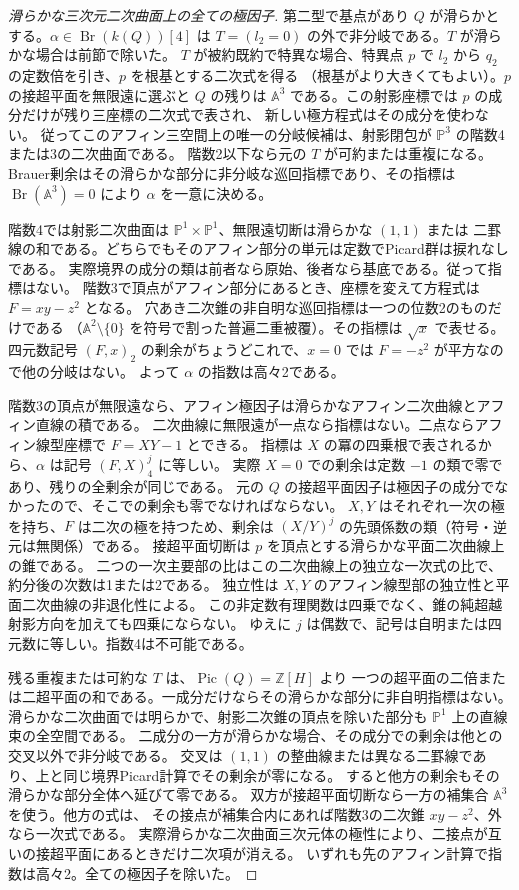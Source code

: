 \begin{proof}[滑らかな三次元二次曲面上の全ての極因子]
第二型で基点があり $Q$ が滑らかとする。$\alpha\in\operatorname{Br}(k(Q))[4]$ は
$T=(l_2=0)$ の外で非分岐である。$T$ が滑らかな場合は前節で除いた。
$T$ が被約既約で特異な場合、特異点 $p$ で $l_2$ から $q_2$ の定数倍を引き、$p$ を根基とする二次式を得る
（根基がより大きくてもよい）。$p$ の接超平面を無限遠に選ぶと
$Q$ の残りは $\mathbb A^3$ である。この射影座標では $p$ の成分だけが残り三座標の二次式で表され、
新しい極方程式はその成分を使わない。
従ってこのアフィン三空間上の唯一の分岐候補は、射影閉包が $\mathbb P^3$ の階数4または3の二次曲面である。
階数2以下なら元の $T$ が可約または重複になる。
Brauer剰余はその滑らかな部分に非分岐な巡回指標であり、その指標は $\operatorname{Br}(\mathbb A^3)=0$ により
$\alpha$ を一意に決める。

階数4では射影二次曲面は $\mathbb P^1\times\mathbb P^1$、無限遠切断は滑らかな $(1,1)$ または
二罫線の和である。どちらでもそのアフィン部分の単元は定数でPicard群は捩れなしである。
実際境界の成分の類は前者なら原始、後者なら基底である。従って指標はない。
階数3で頂点がアフィン部分にあるとき、座標を変えて方程式は $F=xy-z^2$ となる。
穴あき二次錐の非自明な巡回指標は一つの位数2のものだけである
（$\mathbb A^2\setminus\{0\}$ を符号で割った普遍二重被覆）。その指標は $\sqrt{x}$ で表せる。
四元数記号 $(F,x)_2$ の剰余がちょうどこれで、$x=0$ では $F=-z^2$ が平方なので他の分岐はない。
よって $\alpha$ の指数は高々2である。

階数3の頂点が無限遠なら、アフィン極因子は滑らかなアフィン二次曲線とアフィン直線の積である。
二次曲線に無限遠が一点なら指標はない。二点ならアフィン線型座標で $F=XY-1$ とできる。
指標は $X$ の冪の四乗根で表されるから、$\alpha$ は記号 $(F,X)_4^j$ に等しい。
実際 $X=0$ での剰余は定数 $-1$ の類で零であり、残りの全剰余が同じである。
元の $Q$ の接超平面因子は極因子の成分でなかったので、そこでの剰余も零でなければならない。
$X,Y$ はそれぞれ一次の極を持ち、$F$ は二次の極を持つため、剰余は
$(X/Y)^j$ の先頭係数の類（符号・逆元は無関係）である。
接超平面切断は $p$ を頂点とする滑らかな平面二次曲線上の錐である。
二つの一次主要部の比はこの二次曲線上の独立な一次式の比で、約分後の次数は1または2である。
独立性は $X,Y$ のアフィン線型部の独立性と平面二次曲線の非退化性による。
この非定数有理関数は四乗でなく、錐の純超越射影方向を加えても四乗にならない。
ゆえに $j$ は偶数で、記号は自明または四元数に等しい。指数4は不可能である。

残る重複または可約な $T$ は、$\operatorname{Pic}(Q)=\mathbb Z[H]$ より
一つの超平面の二倍または二超平面の和である。一成分だけならその滑らかな部分に非自明指標はない。
滑らかな二次曲面では明らかで、射影二次錐の頂点を除いた部分も $\mathbb P^1$ 上の直線束の全空間である。
二成分の一方が滑らかな場合、その成分での剰余は他との交叉以外で非分岐である。
交叉は $(1,1)$ の整曲線または異なる二罫線であり、上と同じ境界Picard計算でその剰余が零になる。
すると他方の剰余もその滑らかな部分全体へ延びて零である。
双方が接超平面切断なら一方の補集合 $\mathbb A^3$ を使う。他方の式は、
その接点が補集合内にあれば階数3の二次錐 $xy-z^2$、外なら一次式である。
実際滑らかな二次曲面三次元体の極性により、二接点が互いの接超平面にあるときだけ二次項が消える。
いずれも先のアフィン計算で指数は高々2。全ての極因子を除いた。
\end{proof}
